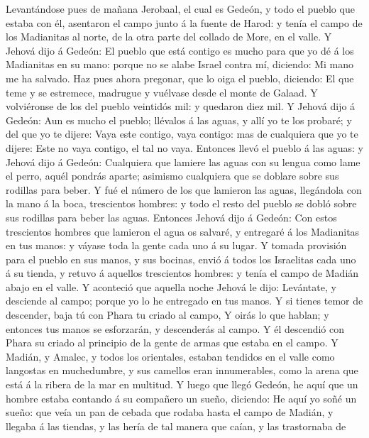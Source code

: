  Levantándose pues de mañana Jerobaal, el cual es Gedeón, y
todo el pueblo que estaba con él, asentaron el campo junto á la fuente
de Harod: y tenía el campo de los Madianitas al norte, de la otra parte
del collado de More, en el valle.  Y Jehová dijo á Gedeón:
El pueblo que está contigo es mucho para que yo dé á los Madianitas en
su mano: porque no se alabe Israel contra mí, diciendo: Mi mano me ha
salvado.  Haz pues ahora pregonar, que lo oiga el pueblo,
diciendo: El que teme y se estremece, madrugue y vuélvase desde el monte
de Galaad. Y volviéronse de los del pueblo veintidós mil: y quedaron
diez mil.  Y Jehová dijo á Gedeón: Aun es mucho el pueblo;
llévalos á las aguas, y allí yo te los probaré; y del que yo te dijere:
Vaya este contigo, vaya contigo: mas de cualquiera que yo te dijere:
Este no vaya contigo, el tal no vaya.  Entonces llevó el
pueblo á las aguas: y Jehová dijo á Gedeón: Cualquiera que lamiere las
aguas con su lengua como lame el perro, aquél pondrás aparte; asimismo
cualquiera que se doblare sobre sus rodillas para beber.  Y
fué el número de los que lamieron las aguas, llegándola con la mano á la
boca, trescientos hombres: y todo el resto del pueblo se dobló sobre sus
rodillas para beber las aguas.  Entonces Jehová dijo á
Gedeón: Con estos trescientos hombres que lamieron el agua os salvaré, y
entregaré á los Madianitas en tus manos: y váyase toda la gente cada uno
á su lugar.  Y tomada provisión para el pueblo en sus manos,
y sus bocinas, envió á todos los Israelitas cada uno á su tienda, y
retuvo á aquellos trescientos hombres: y tenía el campo de Madián abajo
en el valle.  Y aconteció que aquella noche Jehová le dijo:
Levántate, y desciende al campo; porque yo lo he entregado en tus manos.
 Y si tienes temor de descender, baja tú con Phara tu
criado al campo,  Y oirás lo que hablan; y entonces tus
manos se esforzarán, y descenderás al campo. Y él descendió con Phara su
criado al principio de la gente de armas que estaba en el campo.
 Y Madián, y Amalec, y todos los orientales, estaban
tendidos en el valle como langostas en muchedumbre, y sus camellos eran
innumerables, como la arena que está á la ribera de la mar en multitud.
 Y luego que llegó Gedeón, he aquí que un hombre estaba
contando á su compañero un sueño, diciendo: He aquí yo soñé un sueño:
que veía un pan de cebada que rodaba hasta el campo de Madián, y llegaba
á las tiendas, y las hería de tal manera que caían, y las trastornaba de
